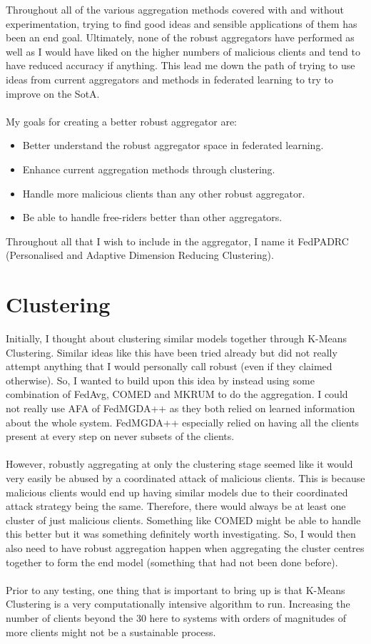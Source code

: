 Throughout all of the various aggregation methods covered with and without experimentation, trying to find good ideas and sensible applications of them has been an end goal.
Ultimately, none of the robust aggregators have performed as well as I would have liked on the higher numbers of malicious clients and tend to have reduced accuracy if anything.
This lead me down the path of trying to use ideas from current aggregators and methods in federated learning to try to improve on the SotA.
\\ \\
My goals for creating a better robust aggregator are:
\begin{itemize}
    \item Better understand the robust aggregator space in federated learning.
    \item Enhance current aggregation methods through clustering.
    \item Handle more malicious clients than any other robust aggregator.
    \item Be able to handle free-riders better than other aggregators.
\end{itemize}
Throughout all that I wish to include in the aggregator, I name it FedPADRC (Personalised and Adaptive Dimension Reducing Clustering).


\section{Clustering}
Initially, I thought about clustering similar models together through K-Means Clustering.
Similar ideas like this have been tried already \cite{cluster_robagg} but did not really attempt anything that I would personally call robust (even if they claimed otherwise).
So, I wanted to build upon this idea by instead using some combination of FedAvg, COMED and MKRUM to do the aggregation.
I could not really use AFA of FedMGDA++ as they both relied on learned information about the whole system.
FedMGDA++ especially relied on having all the clients present at every step on never subsets of the clients.
\\ \\ 
However, robustly aggregating at only the clustering stage seemed like it would very easily be abused by a coordinated attack of malicious clients.
This is because malicious clients would end up having similar models due to their coordinated attack strategy being the same.
Therefore, there would always be at least one cluster of just malicious clients.
Something like COMED might be able to handle this better but it was something definitely worth investigating.
So, I would then also need to have robust aggregation happen when aggregating the cluster centres together to form the end model (something that had not been done before).
\\ \\
Prior to any testing, one thing that is important to bring up is that K-Means Clustering is a very computationally intensive algorithm to run.
Increasing the number of clients beyond the 30 here to systems with orders of magnitudes of more clients might not be a sustainable process.

